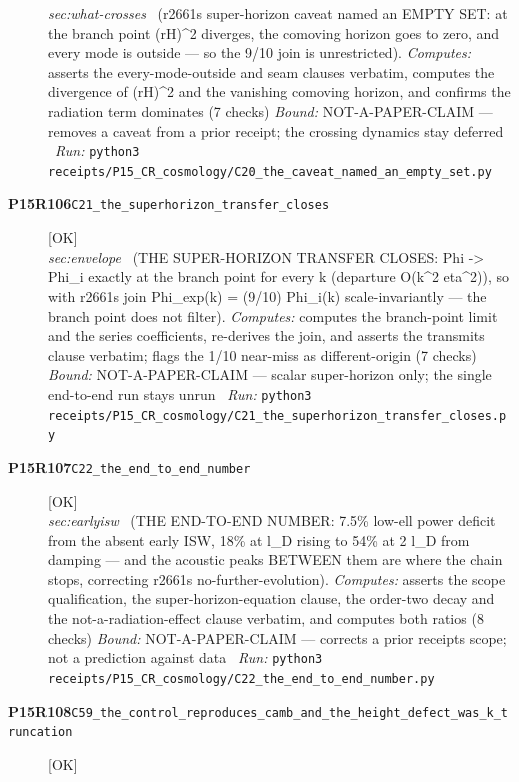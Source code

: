 \begin{description}
\textit{sec:what-crosses} \ (r2661s super-horizon caveat named an EMPTY SET: at the branch point (rH)\textasciicircum{}2 diverges, the comoving horizon goes to zero, and every mode is outside --- so the 9/10 join is unrestricted). 
\emph{Computes:} asserts the every-mode-outside and seam clauses verbatim, computes the divergence of (rH)\textasciicircum{}2 and the vanishing comoving horizon, and confirms the radiation term dominates (7 checks)
 \emph{Bound:} NOT-A-PAPER-CLAIM --- removes a caveat from a prior receipt; the crossing dynamics stay deferred
\ \emph{Run:} \texttt{python3 receipts/P15\_CR\_cosmology/C20\_the\_caveat\_named\_an\_empty\_set.py}
\item[\rcptlabel{C21_the_superhorizon_transfer_closes}{P15R106}\textbf{P15R106}\quad\texttt{C21\_the\_superhorizon\_transfer\_closes}]\hfill\textsf{[OK]}\\
\textit{sec:envelope} \ (THE SUPER-HORIZON TRANSFER CLOSES: Phi -> Phi\_i exactly at the branch point for every k (departure O(k\textasciicircum{}2 eta\textasciicircum{}2)), so with r2661s join Phi\_exp(k) = (9/10) Phi\_i(k) scale-invariantly --- the branch point does not filter). 
\emph{Computes:} computes the branch-point limit and the series coefficients, re-derives the join, and asserts the transmits clause verbatim; flags the 1/10 near-miss as different-origin (7 checks)
 \emph{Bound:} NOT-A-PAPER-CLAIM --- scalar super-horizon only; the single end-to-end run stays unrun
\ \emph{Run:} \texttt{python3 receipts/P15\_CR\_cosmology/C21\_the\_superhorizon\_transfer\_closes.py}
\item[\rcptlabel{C22_the_end_to_end_number}{P15R107}\textbf{P15R107}\quad\texttt{C22\_the\_end\_to\_end\_number}]\hfill\textsf{[OK]}\\
\textit{sec:earlyisw} \ (THE END-TO-END NUMBER: 7.5\% low-ell power deficit from the absent early ISW, 18\% at l\_D rising to 54\% at 2 l\_D from damping --- and the acoustic peaks BETWEEN them are where the chain stops, correcting r2661s no-further-evolution). 
\emph{Computes:} asserts the scope qualification, the super-horizon-equation clause, the order-two decay and the not-a-radiation-effect clause verbatim, and computes both ratios (8 checks)
 \emph{Bound:} NOT-A-PAPER-CLAIM --- corrects a prior receipts scope; not a prediction against data
\ \emph{Run:} \texttt{python3 receipts/P15\_CR\_cosmology/C22\_the\_end\_to\_end\_number.py}
\item[\rcptlabel{C59_the_control_reproduces_camb_and_the_height_defect_was_k_truncation}{P15R108}\textbf{P15R108}\quad\texttt{C59\_the\_control\_reproduces\_camb\_and\_the\_height\_defect\_was\_k\_truncation}]\hfill\textsf{[OK]}\\

\end{description}
